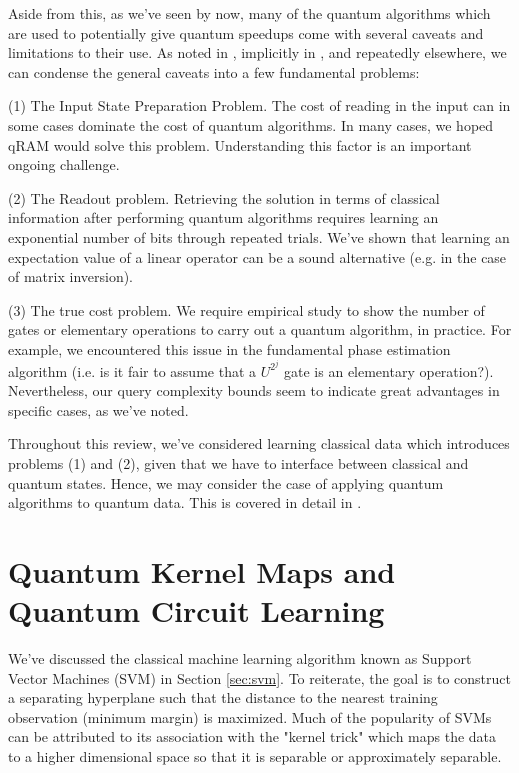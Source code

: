 \documentclass[main.tex]{subfiles}
\begin{document}
Aside from this, as we've seen by now, many of the quantum algorithms which are used to potentially give quantum speedups come with several caveats and limitations to their use. As noted in \cite{biamonte2017quantum}, implicitly in \cite{aaronson2015read}, and repeatedly elsewhere, we can condense the general caveats into a few fundamental problems: 

(1) The Input State Preparation Problem. The cost of reading in the input can in some cases dominate the cost of quantum algorithms. In many cases, we hoped qRAM would solve this problem. Understanding this factor is an important ongoing challenge.

(2) The Readout problem. Retrieving the solution in terms of classical information after performing quantum algorithms requires learning an exponential number of bits through repeated trials. We've shown that learning an expectation value of a linear operator can be a sound alternative (e.g. in the case of matrix inversion).

(3) The true cost problem. We require empirical study to show the number of gates or elementary operations to carry out a quantum algorithm, in practice. For example, we encountered this issue in the fundamental phase estimation algorithm (i.e. is it fair to assume that a $U^{2^j}$ gate is an elementary operation?). Nevertheless, our query complexity bounds seem to indicate great advantages in specific cases, as we've noted.

Throughout this review, we've considered learning classical data which introduces problems (1) and (2), given that we have to interface between classical and quantum states. Hence, we may consider the case of applying quantum algorithms to quantum data. This is covered in detail in \cite{aaronson2007learnability}.

\chapter{Quantum Kernel Maps and Quantum Circuit Learning}

We've discussed the classical machine learning algorithm known as Support Vector Machines (SVM) in Section \ref{sec:svm}. To reiterate, the goal is to construct a separating hyperplane such that the distance to the nearest training observation (minimum margin) is maximized. Much of the popularity of SVMs can be attributed to its association with the "kernel trick" which maps the data to a higher dimensional space so that it is separable or approximately separable. 
\end{document}
